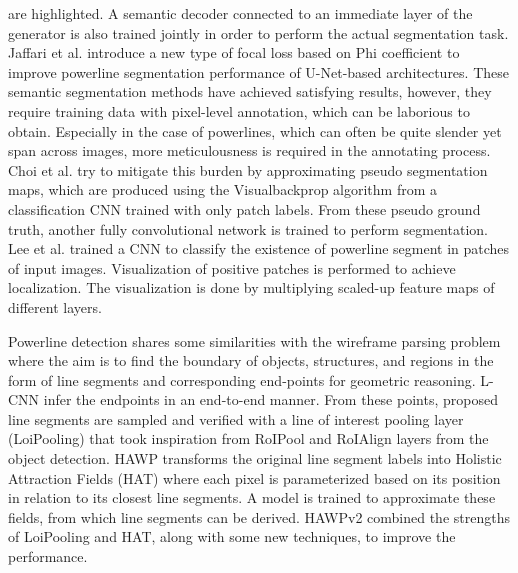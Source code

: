 \documentclass[journal]{IEEEtran}
\begin{document}
are highlighted. A semantic decoder connected to an immediate layer of the generator is also trained jointly in order to perform the actual segmentation task. Jaffari et al. \cite{related_work_rabeea_haffari_2021} introduce a new type of focal loss based on Phi coefficient \cite{phi_coeff} to improve powerline segmentation performance of U-Net\cite{unet}-based architectures. These semantic segmentation methods have achieved satisfying results, however, they require training data with pixel-level annotation, which can be laborious to obtain.  Especially in the case of powerlines, which can often be quite slender yet span across images, more meticulousness is required in the annotating process. Choi et al. \cite{related_work_hyeyeon_choi_2021} try to mitigate this burden by approximating pseudo segmentation maps, which are produced using the Visualbackprop algorithm \cite{vbp} from a classification CNN trained with only patch labels. From these pseudo ground truth, another fully convolutional network is trained to perform segmentation. Lee et al. \cite{related_work_sang_jun_lee_2017} trained a CNN to classify the existence of powerline segment in patches of input images. Visualization of positive patches is performed to achieve localization. The visualization is done by multiplying scaled-up feature maps of different layers.

Powerline detection shares some similarities with the wireframe parsing problem where the aim is to find the boundary of objects, structures, and regions in the form of line segments and corresponding end-points for geometric reasoning. L-CNN \cite{lcnn} infer the endpoints in an end-to-end manner. From these points, proposed line segments are sampled and verified with a line of interest pooling layer (LoiPooling) that took inspiration from RoIPool \cite{fastrcnn} and RoIAlign \cite{maskrcnn} layers from the object detection. HAWP \cite{hawp} transforms the original line segment labels into Holistic Attraction Fields (HAT) where each pixel is parameterized based on its position in relation to its closest line segments. A model is trained to approximate these fields, from which line segments can be derived. HAWPv2 \cite{hawpv2} combined the strengths of LoiPooling and HAT, along with some new techniques, to improve the performance. 
\end{document}
